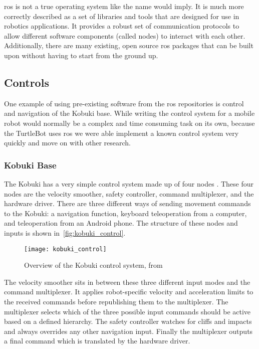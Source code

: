 \documentclass[thesis.tex]{subfile}
\begin{document}
\gls{ros} is not a true operating system like the name would imply. It is much more correctly described as a set of libraries and tools that are designed for use in robotics applications. It provides a robust set of communication protocols to allow different software components (called nodes) to interact with each other. Additionally, there are many existing, open source \gls{ros} packages that can be built upon without having to start from the ground up.

\subsection{Controls}
One example of using pre-existing software from the \gls{ros} repositories is control and navigation of the Kobuki base. While writing the control system for a mobile robot would normally be a complex and time consuming task on its own, because the TurtleBot uses \gls{ros} we were able implement a known control system very quickly and move on with other research.

\subsubsection{Kobuki Base}
The Kobuki has a very simple control system made up of four nodes \cite{KobukiControl}. These four nodes are the velocity smoother, safety controller, command multiplexer, and the hardware driver. There are three different ways of sending movement commands to the Kobuki: a navigation function, keyboard teleoperation from a computer, and teleoperation from an Android phone. The structure of these nodes and inputs is shown in~\autoref{fig:kobuki_control}.

\begin{figure}
\texttt{[image: kobuki\_control]}
\caption{Overview of the Kobuki control system, from~\cite{KobukiControl}}
\label{fig:kobuki_control}
\end{figure}

The velocity smoother sits in between these  three different input modes and the command multiplexer. It applies robot-specific velocity and acceleration limits to the received commands before republishing them to the multiplexer. The multiplexer selects which of the three possible input commands should be active based on a defined hierarchy. The safety controller watches for cliffs and impacts and always overrides any other navigation input. Finally the multiplexer outputs a final command which is translated by the hardware driver.
 
\end{document}
